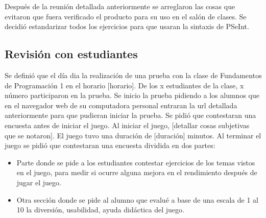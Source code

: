 Después de la reunión detallada anteriormente se arreglaron las cosas que evitaron que fuera verificado el producto para su uso en el salón de clases. Se decidió estandarizar todos los ejercicios para que usaran la sintaxis de PSeInt.

\subsection{Revisión con estudiantes}
Se definió que el día {dia} la realización de una prueba con la clase de Fundamentos de Programación 1 en el horario [horario]. De los x estudiantes de la clase, x número participaron en la prueba. Se inicio la prueba pidiendo a los alumnos que en el navegador web de su computadora personal entraran la url detallada anteriormente para que pudieran iniciar la prueba. Se pidió que contestaran una encuesta antes de iniciar el juego. Al iniciar el juego, [detallar cosas subjetivas que se notaron]. El juego tuvo una duración de [duración] minutos. Al terminar el juego se pidió que contestaran una encuesta dividida en dos partes:
\begin{itemize}
    \item Parte donde se pide a los estudiantes contestar ejercicios de los temas vistos en el juego, para medir si ocurre alguna mejora en el rendimiento después de jugar el juego.
    \item Otra sección donde se pide al alumno que evalué a base de una escala de 1 al 10 la diversión, usabilidad, ayuda didáctica del juego.
\end{itemize}